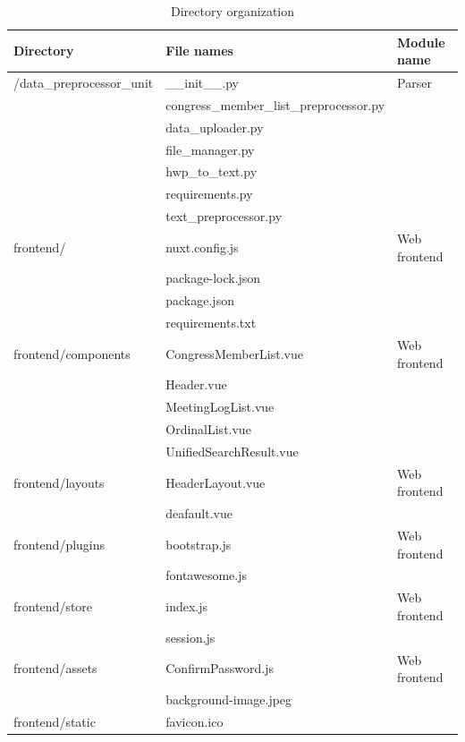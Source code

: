 \documentclass[conference]{IEEEtran}
\begin{document}
 \begin{table}[htbp]
  \renewcommand{\arraystretch}{1.5}
\caption{Directory organization}
\begin{center}
\begin{tabular}{|p{2.5cm}|p{4cm}|p{1.2cm}|}
\hline
\textbf{Directory} & \textbf{File names } &\textbf{Module name} \\
\hline
/data\_preprocessor\_unit& \_\_init\_\_.py&Parser \\
& congress\_member\_list\_preprocessor.py&\\
& data\_uploader.py &\\
& file\_manager.py &\\
& hwp\_to\_text.py & \\
& requirements.py & \\
&text\_preprocessor.py& \\

\hline
frontend/& nuxt.config.js&Web frontend \\
& package-lock.json & \\
& package.json & \\
& requirements.txt & \\

\hline
frontend/components& CongressMemberList.vue& Web frontend\\
& Header.vue&\\
& MeetingLogList.vue & \\
& OrdinalList.vue & \\
& UnifiedSearchResult.vue & \\

\hline
frontend/layouts& HeaderLayout.vue& Web frontend\\
& deafault.vue &\\

\hline
frontend/plugins & bootstrap.js & Web frontend\\
& fontawesome.js & \\
\hline
frontend/store& index.js & Web frontend \\
& session.js & \\
\hline
frontend/assets & ConfirmPassword.js & Web frontend\\
& background-image.jpeg & \\
\hline

frontend/static & favicon.ico & \\
\hline


\end{tabular}
\end{center}
\end{table}
\end{document}
